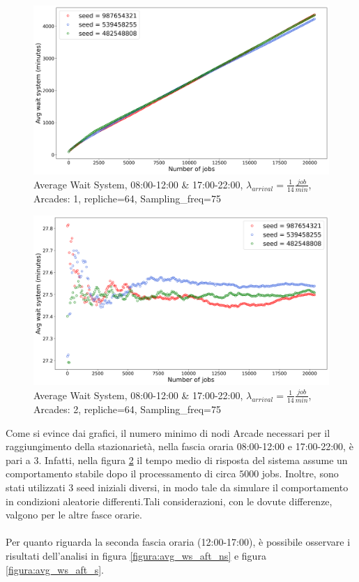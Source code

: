 \documentclass{article}
\begin{document}
\begin{figure}[H]
\centering
\captionsetup{justification=centering,margin=2cm}
\includegraphics[scale=0.48]{images/transient_mor_ns.png}
\caption{Average Wait System, 08:00-12:00 \& 17:00-22:00, $\lambda_{arrival}=\frac{1}{14} \frac{job}{min}$, Arcades: 1, repliche=64, Sampling\_freq=75}\label{figura:avg_ws_mor_ns}
\end{figure}
\begin{figure}[H]
\centering
\captionsetup{justification=centering,margin=2cm}
\includegraphics[scale=0.48]{images/transient_mor_s.png}
\caption{Average Wait System, 08:00-12:00 \& 17:00-22:00, $\lambda_{arrival}=\frac{1}{14} \frac{job}{min}$, Arcades: 2, repliche=64, Sampling\_freq=75}\label{figura:avg_ws_mor_s}
\end{figure}

Come si evince dai grafici, il numero minimo di nodi Arcade necessari per il raggiungimento della stazionarietà, nella fascia oraria 08:00-12:00 e 17:00-22:00, è pari a 3. Infatti, nella figura \ref{figura:avg_ws_mor_s} il tempo medio di risposta del sistema assume un comportamento stabile dopo il processamento di circa $5000$ jobs. Inoltre, sono stati utilizzati 3 seed iniziali diversi, in modo tale da simulare il comportamento in condizioni aleatorie differenti.Tali considerazioni, con le dovute differenze, valgono per le altre fasce orarie.
\\ \\
Per quanto riguarda la seconda fascia oraria (12:00-17:00), è possibile osservare i risultati dell'analisi in figura \ref{figura:avg_ws_aft_ns} e figura \ref{figura:avg_ws_aft_s}.
\end{document}
